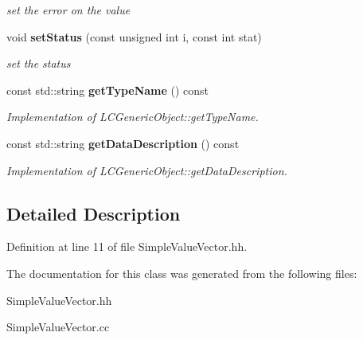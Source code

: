 \begin{DoxyCompactItemize}
\begin{DoxyCompactList}\small\item\em set the error on the value \end{DoxyCompactList}\item 
void {\bf set\-Status} (const unsigned int i, const int stat)\label{classCALICE_1_1SimpleValueVector_aa25bc9084b4859751e49f17e45c01662}

\begin{DoxyCompactList}\small\item\em set the status \end{DoxyCompactList}\item 
const std\-::string {\bf get\-Type\-Name} () const \label{classCALICE_1_1SimpleValueVector_ad521e9fdf796c74a216d3028dad16883}

\begin{DoxyCompactList}\small\item\em Implementation of L\-C\-Generic\-Object\-::get\-Type\-Name. \end{DoxyCompactList}\item 
const std\-::string {\bf get\-Data\-Description} () const \label{classCALICE_1_1SimpleValueVector_a7c7524dbd63b69b0a6daa100f1f36421}

\begin{DoxyCompactList}\small\item\em Implementation of L\-C\-Generic\-Object\-::get\-Data\-Description. \end{DoxyCompactList}\end{DoxyCompactItemize}


\subsection{Detailed Description}


Definition at line 11 of file Simple\-Value\-Vector.\-hh.



The documentation for this class was generated from the following files\-:\begin{DoxyCompactItemize}
\item 
Simple\-Value\-Vector.\-hh\item 
Simple\-Value\-Vector.\-cc\end{DoxyCompactItemize}
